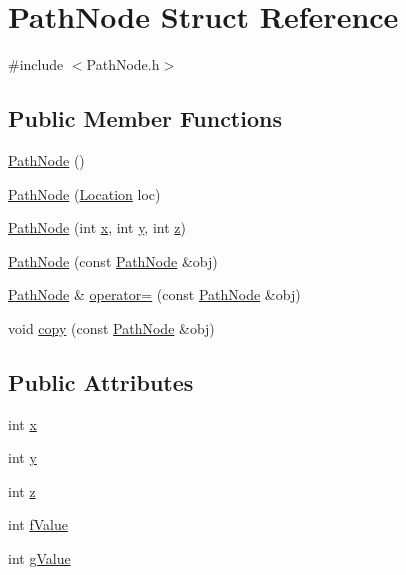 \hypertarget{structPathNode}{\section{Path\-Node Struct Reference}
\label{structPathNode}
}


{\ttfamily \#include $<$Path\-Node.\-h$>$}

\subsection*{Public Member Functions}
\begin{DoxyCompactItemize}
\item 
\hyperlink{structPathNode_a8407a02423706e133bfea2b4c872289a}{Path\-Node} ()
\item 
\hyperlink{structPathNode_ab9bb9c07aad81a089e4cff8b2ba3f62b}{Path\-Node} (\hyperlink{structLocation}{Location} loc)
\item 
\hyperlink{structPathNode_a5cd5eedf94ada788f49d53350142f4f5}{Path\-Node} (int \hyperlink{structPathNode_a261418246914f0b5161419061859afb8}{x}, int \hyperlink{structPathNode_a1dba178e234b0a1e499e408985400107}{y}, int \hyperlink{structPathNode_ada356a6ae5e9463c3bf730a161639937}{z})
\item 
\hyperlink{structPathNode_a89625776708f7c5df719e07460c8ff4b}{Path\-Node} (const \hyperlink{structPathNode}{Path\-Node} \&obj)
\item 
\hyperlink{structPathNode}{Path\-Node} \& \hyperlink{structPathNode_a5b90811f20a6905e6e690ea43a441f3e}{operator=} (const \hyperlink{structPathNode}{Path\-Node} \&obj)
\item 
void \hyperlink{structPathNode_a2bd6a3ca0e38adeb9524d3b706b70b2b}{copy} (const \hyperlink{structPathNode}{Path\-Node} \&obj)
\end{DoxyCompactItemize}
\subsection*{Public Attributes}
\begin{DoxyCompactItemize}
\item 
int \hyperlink{structPathNode_a261418246914f0b5161419061859afb8}{x}
\item 
int \hyperlink{structPathNode_a1dba178e234b0a1e499e408985400107}{y}
\item 
int \hyperlink{structPathNode_ada356a6ae5e9463c3bf730a161639937}{z}
\item 
int \hyperlink{structPathNode_a6599b3700d0500aa34acf196649bce51}{f\-Value}
\item 
int \hyperlink{structPathNode_a90b21e2f0cf6142db81e7753f582b1cc}{g\-Value}
\end{DoxyCompactItemize}


